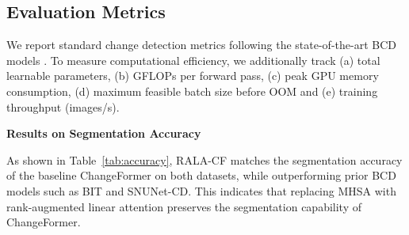 \documentclass[runningheads]{llncs}
\begin{document}
\subsection{Evaluation Metrics}

We report standard change detection metrics following the state-of-the-art BCD models \cite{Zheng2020LEVIR,Zhang2020FusionNetDSIFN,Bandara2022ChangeForme,Chen2022BIT,Fang2021SNUNetCD}. To measure computational efficiency, we
additionally track (a) total learnable parameters, (b) GFLOPs per forward pass,
(c) peak GPU memory consumption, (d) maximum feasible batch size before OOM and
(e) training throughput (images/s).

\noindent \textbf{Results on Segmentation Accuracy}

\begin{table}[h!]
\caption{Segmentation accuracy of baseline BCD models and our variants on
LEVIR-CD and DSIFN-CD using $256\times256$ input patches and batch size 16.
Metrics for SNUNet-CD and BIT are taken from the original ChangeFormer paper
\cite{acuna2026efficient,Bandara2022ChangeFormer}.}
\label{tab:accuracy}
\centering
{}
\end{table}

\noindent As shown in Table~\ref{tab:accuracy}, RALA-CF matches the
segmentation accuracy of the baseline ChangeFormer on both datasets, while
outperforming prior BCD models such as BIT and SNUNet-CD. This indicates that
replacing MHSA with rank-augmented linear attention preserves the segmentation
capability of ChangeFormer.
\end{document}
